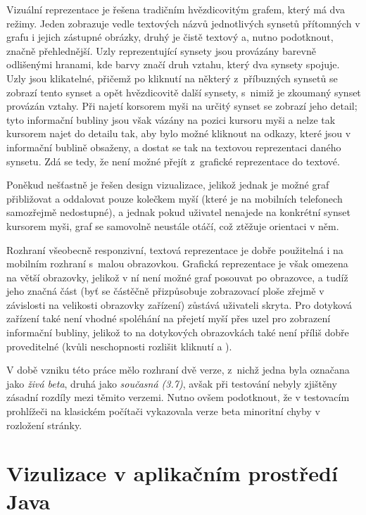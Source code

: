 \documentclass[a4paper, 11pt, oneside, showtrims]{book}
\begin{document}
					Vizuální reprezentace je řešena tradičním hvězdicovitým grafem, který má dva režimy. Jeden zobrazuje vedle textových názvů jednotlivých synsetů přítomných v grafu i jejich zástupné obrázky, druhý je čistě textový a, nutno podotknout, značně přehlednější. Uzly reprezentující synsety jsou provázány barevně odlišenými hranami, kde barvy značí druh vztahu, který dva synsety spojuje. Uzly jsou klikatelné, přičemž po kliknutí na některý z~příbuzných synsetů se zobrazí tento synset a opět hvězdicovitě další synsety, s~nimiž je zkoumaný synset provázán vztahy. Při najetí korsorem myši na určitý synset se zobrazí jeho detail; tyto informační bubliny jsou však vázány na pozici kursoru myši a nelze tak kursorem najet do detailu tak, aby bylo možné kliknout na odkazy, které jsou v informační bublině obsaženy, a dostat se tak na textovou reprezentaci daného synsetu. Zdá se tedy, že není možné přejít z~grafické reprezentace do textové.

					Poněkud nešťastně je řešen design vizualizace, jelikož jednak je možné graf přibližovat a oddalovat pouze kolečkem myší (které je na mobilních telefonech samozřejmě nedostupné), a jednak pokud uživatel nenajede na konkrétní synset kursorem myši, graf se samovolně neustále otáčí, což ztěžuje orientaci v něm.

					Rozhraní všeobecně responzivní, textová reprezentace je dobře použitelná i na mobilním rozhraní s~malou obrazovkou. Grafická reprezentace je však omezena na větší obrazovky, jelikož v ní není možné graf posouvat po obrazovce, a tudíž jeho značná část (byť se částěčně přizpůsobuje zobrazovací ploše zřejmě v závislosti na velikosti obrazovky zařízení) zůstává uživateli skryta. Pro dotyková zařízení také není vhodné spoléhání na přejetí myší přes uzel pro zobrazení informační bubliny, jelikož to na dotykových obrazovkách také není příliš dobře proveditelné (kvůli neschopnosti rozlišit kliknutí a ).

					V době vzniku této práce mělo rozhraní dvě verze, z~nichž jedna byla označana jako \textit{živá beta}, druhá jako \textit{současná (3.7)}, avšak při testování nebyly zjištěny zásadní rozdíly mezi těmito verzemi. Nutno ovšem podotknout, že v testovacím prohlížeči na klasickém počítači vykazovala verze beta minoritní chyby v rozložení stránky.

			\section{Vizulizace v aplikačním prostředí Java}
\end{document}
